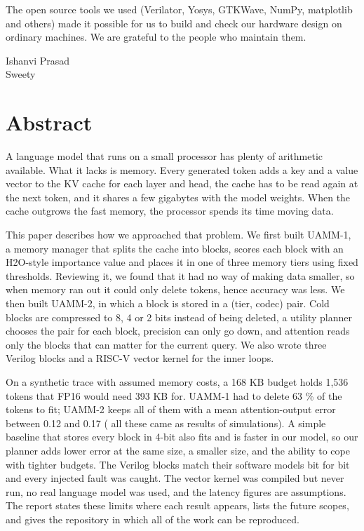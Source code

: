 \documentclass[12pt,a4paper]{report}
\begin{document}
The open source tools we used (Verilator, Yosys, GTKWave, NumPy, matplotlib and others) made it possible for us to build and check our hardware design on ordinary machines. We are grateful to the people who maintain them.

\vspace{1.2cm}
Ishanvi Prasad\\
Sweety\\
\clearpage
\chapter*{Abstract}
A language model that runs on a small processor has plenty of arithmetic available. What it lacks is memory. Every generated token adds a key and a value vector to the KV cache for each layer and head, the cache has to be read again at the next token, and it shares a few gigabytes with the model weights. When the cache outgrows the fast memory, the processor spends its time moving data.

This paper describes how we approached that problem. We first built UAMM-1, a memory manager that splits the cache into blocks, scores each block with an H2O-style importance value and places it in one of three memory tiers using fixed thresholds. Reviewing it, we found that it had no way of making data smaller, so when memory ran out it could only delete tokens, hence accuracy was less. We then built UAMM-2, in which a block is stored in a (tier, codec) pair. Cold blocks are compressed to 8, 4 or 2 bits instead of being deleted, a utility planner chooses the pair for each block, precision can only go down, and attention reads only the blocks that can matter for the current query. We also wrote three Verilog blocks and a RISC-V vector kernel for the inner loops.

On a synthetic trace with assumed memory costs, a 168 KB budget holds 1,536 tokens that FP16 would need 393 KB for. UAMM-1 had to delete 63 \% of the tokens to fit; UAMM-2 keeps all of them with a mean attention-output error between 0.12 and 0.17 ( all these came as results of simulations). A simple baseline that stores every block in 4-bit also fits and is faster in our model, so our planner adds lower error at the same size, a smaller size, and the ability to cope with tighter budgets. The Verilog blocks match their software models bit for bit and every injected fault was caught. The vector kernel was compiled but never run, no real language model was used, and the latency figures are assumptions. The report states these limits where each result appears, lists the future scopes, and gives the repository in which all of the work can be reproduced.
\end{document}
